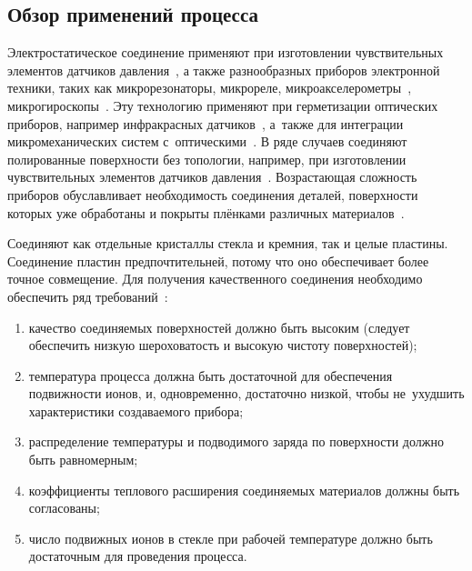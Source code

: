 \subsection{Обзор применений процесса}

Электростатическое соединение применяют при изготовлении чувствительных элементов датчиков давления~\cite{kozin2010_microel_datch_fiz_vel}, а также разнообразных приборов электронной техники, таких как микрорезонаторы, микрореле, микроакселерометры~\cite{lit_Esashi_Wafer2008}, микрогироскопы~\cite{Rogers_current_limited_AB_2005}. Эту технологию применяют при герметизации оптических приборов, например инфракрасных датчиков~\cite{lit_Esashi_Wafer2008}, а~также для интеграции микромеханических систем с~оптическими~\cite{saran2003_ab_opt_fibers}. В ряде случаев соединяют полированные поверхности без топологии, например, при изготовлении чувствительных элементов датчиков давления~\cite{Andreev2013_Analiz_met_elektrostat_svar}. Возрастающая сложность приборов обуславливает необходимость соединения деталей, поверхности которых уже обработаны и покрыты плёнками различных материалов~\cite{Dragoi_cmos_wafer_bonding}.

Соединяют как отдельные кристаллы стекла и кремния, так и целые пластины. Соединение пластин предпочтительней, потому что оно обеспечивает более точное совмещение. Для получения качественного соединения необходимо обеспечить ряд требований~\cite{Low_temp_wafer_AB, Cozma_Puers_1995, Sinev_osoben_primen_inzh_vest201408}:
\begin{enumerate}[label=\asbuk*)]
    \item качество соединяемых поверхностей должно быть высоким (следует обеспечить
    низкую шероховатость и высокую чистоту поверхностей);
    \item температура процесса должна быть достаточной для обеспечения
    подвижности ионов, и, одновременно, достаточно низкой, чтобы
    не~ухудшить характеристики создаваемого прибора;
    \item распределение температуры и подводимого заряда по
    поверхности должно быть равномерным;
    \item коэффициенты теплового расширения соединяемых материалов
    должны быть согласованы;
    \item число подвижных ионов в стекле при рабочей температуре
    должно быть достаточным для проведения процесса.
\end{enumerate}

